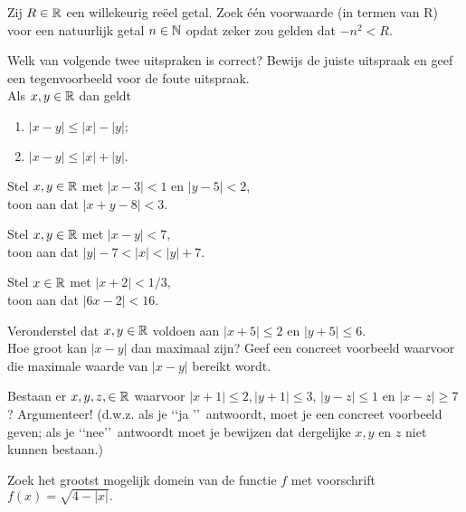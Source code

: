 \documentclass{ximera}
\author{Team Zomercursus}
\begin{document}
\begin{exercise}

 Zij $R\in \mathbb{R}$ een willekeurig
re\"eel getal. Zoek \'{e}\'{e}n voorwaarde (in termen van R) voor
een natuurlijk getal $n\in \mathbb{N}$ opdat zeker zou gelden dat
$-n^2<R$. 
\end{exercise}
\begin{exercise} Welk van volgende twee uitspraken is correct?
Bewijs de juiste uitspraak en geef een tegenvoorbeeld voor de
foute uitspraak.
\\Als $x,y\in\mathbb{R}$ dan geldt\begin{enumerate} \item $|x-y| \leqslant
	|x|-|y|;$ \item $|x-y| \leqslant |x|+|y|.$
\end{enumerate}
\end{exercise}
\begin{exercise}
Stel $x,y\in \mathbb{R}$ met $|x-3|<1$ en $|y-5|<2$,
\\toon aan dat $|x+y-8|<3.$
\end{exercise}
\begin{exercise}
	Stel $x,y\in \mathbb{R}$ met $|x-y|<7,$
\\toon aan dat $|y|-7<|x|<|y|+7.$
\end{exercise}
\begin{exercise}
	 Stel $x\in \mathbb{R}$ met $|x+2|<1/ 3,$
\\toon aan dat $|6x-2|<16.$
\end{exercise}
\begin{exercise}
	 Veronderstel dat $x,y\in \mathbb{R}$ voldoen aan $|x+5| \leqslant2$
en $|y+5| \leqslant6$.
\\ Hoe groot kan $|x-y|$ dan maximaal zijn? Geef een concreet
voorbeeld waarvoor die maximale waarde van $|x-y|$ bereikt wordt.
\end{exercise}
\begin{exercise}
	 Bestaan er $x,y,z,\in\mathbb{R}$ waarvoor $|x+1| \leqslant2,|y+1|
\leqslant3$, $|y-z| \leqslant 1$ en $|x-z| \geqslant 7$?
Argumenteer! (d.w.z. als je \lq\lq ja \rq\rq\  antwoordt, moet je
een concreet voorbeeld geven; als je \lq\lq nee\rq\rq\ antwoordt
moet je bewijzen dat dergelijke $x,y$ en $z$ niet kunnen bestaan.)
\end{exercise}
\begin{exercise}
	 Zoek het grootst mogelijk domein van de functie $f$ met voorschrift $f(x)=\sqrt{4-|x|}.$
\end{exercise}
\end{document}
